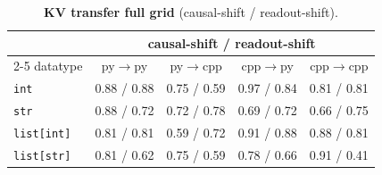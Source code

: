 \begin{table}[ht]\centering\small
\begin{tabular}{lcccc}
\toprule
& \multicolumn{4}{c}{causal-shift / readout-shift} \\
\cmidrule(lr){2-5}
datatype & py$\to$py & py$\to$cpp & cpp$\to$py & cpp$\to$cpp \\
\midrule
\texttt{int} & 0.88 / 0.88 & 0.75 / 0.59 & 0.97 / 0.84 & 0.81 / 0.81 \\
\texttt{str} & 0.88 / 0.72 & 0.72 / 0.78 & 0.69 / 0.72 & 0.66 / 0.75 \\
\texttt{list[int]} & 0.81 / 0.81 & 0.59 / 0.72 & 0.91 / 0.88 & 0.88 / 0.81 \\
\texttt{list[str]} & 0.81 / 0.62 & 0.75 / 0.59 & 0.78 / 0.66 & 0.91 / 0.41 \\
\bottomrule
\end{tabular}
\caption{\textbf{KV transfer full grid} (causal-shift / readout-shift).}
\label{tab:kv-grid}
\end{table}
